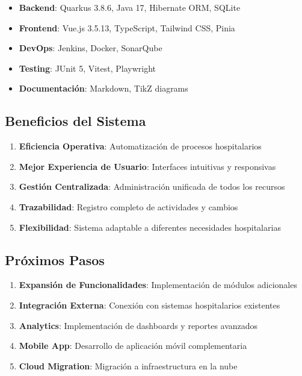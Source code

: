 \documentclass[12pt,a4paper]{article}
\begin{document}
\begin{itemize}
    \item \textbf{Backend}: Quarkus 3.8.6, Java 17, Hibernate ORM, SQLite
    \item \textbf{Frontend}: Vue.js 3.5.13, TypeScript, Tailwind CSS, Pinia
    \item \textbf{DevOps}: Jenkins, Docker, SonarQube
    \item \textbf{Testing}: JUnit 5, Vitest, Playwright
    \item \textbf{Documentación}: Markdown, TikZ diagrams
\end{itemize}

\subsection{Beneficios del Sistema}

\begin{enumerate}
    \item \textbf{Eficiencia Operativa}: Automatización de procesos hospitalarios
    \item \textbf{Mejor Experiencia de Usuario}: Interfaces intuitivas y responsivas
    \item \textbf{Gestión Centralizada}: Administración unificada de todos los recursos
    \item \textbf{Trazabilidad}: Registro completo de actividades y cambios
    \item \textbf{Flexibilidad}: Sistema adaptable a diferentes necesidades hospitalarias
\end{enumerate}

\subsection{Próximos Pasos}

\begin{enumerate}
    \item \textbf{Expansión de Funcionalidades}: Implementación de módulos adicionales
    \item \textbf{Integración Externa}: Conexión con sistemas hospitalarios existentes
    \item \textbf{Analytics}: Implementación de dashboards y reportes avanzados
    \item \textbf{Mobile App}: Desarrollo de aplicación móvil complementaria
    \item \textbf{Cloud Migration}: Migración a infraestructura en la nube
\end{enumerate}
\end{document}
